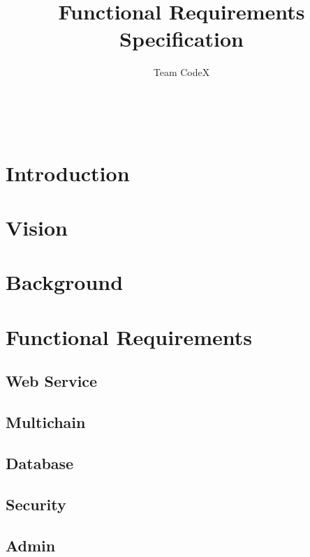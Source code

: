 \documentclass[11pt]{article}
\author{Team CodeX}
\title{Functional Requirements Specification}
\begin{document}
	\setlength{\parskip}{6pt}
	
	
	
	\renewcommand{\thesection}{\arabic{section}}
	\newpage
	
	\tableofcontents
	
	\textsc{}\\[1cm]
	
	\newpage
	
	\section{Introduction}
		
	
	\section{Vision}
		
	
	\section{Background}
		
		
	\section{Functional Requirements}
	
	\subsection{Web Service}
		
		
	\subsection{Multichain}
		
		
	\subsection{Database}
		
		
	\subsection{Security}
		
		
	\subsection{Admin}
		
		
\end{document}
